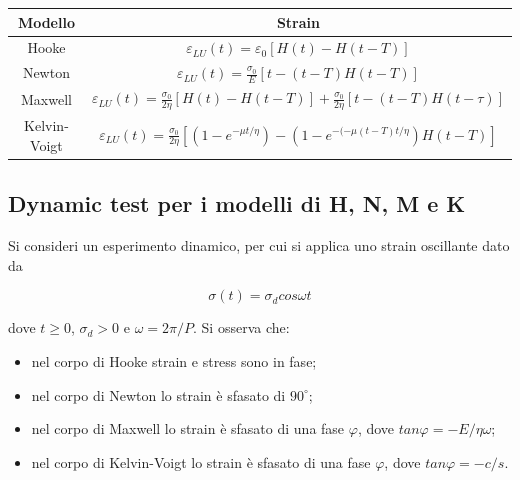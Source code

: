 \documentclass[a4paper,12pt]{book}
\begin{document}
\begin{table}[htb]
\renewcommand{\arraystretch}{1.3}
\setlength{\tabcolsep}{8pt}
\centering
\begin{tabular}{|c|c|}
    \hline
    \textbf{Modello} & \textbf{Strain} \\
    \hline
    \rowcolor{colore7!40}
    Hooke & $\varepsilon_{LU} (t) = \varepsilon_0 [H(t) - H(t-T)]$ \\
    \hline
    \rowcolor{colore2!40}
    Newton & $\varepsilon_{LU} (t) = \frac{\sigma_0}{E} [t - (t-T)H(t-T)]$ \\
    \hline
    \rowcolor{colore4!40}
    Maxwell & $\varepsilon_{LU} (t) = \frac{\sigma_0}{2\eta} [H(t) - H(t-T)] + \frac{\sigma_0}{2\eta} [t - (t-T) H(t-\tau)]$ \\
    \hline
    \rowcolor{colore5!40}
    Kelvin-Voigt & $\varepsilon_{LU} (t) = \frac{\sigma_0}{2\eta} \left[\left(1 - e^{-\mu t/\eta} \right) - \left( 1 - e^{-(- \mu(t-T)t/\eta} \right) H(t-T) \right] $ \\
    \hline
\end{tabular}
\end{table}

\subsection{\textcolor{colore7}{Dynamic test per i modelli di H, N, M e K}}

Si consideri un esperimento dinamico, per cui si applica uno strain oscillante dato da

\begin{equation}
    \sigma(t) = \sigma_d cos \omega t
\end{equation}

\noindent
dove $t \ge 0$, $\sigma_d > 0$ e $\omega = 2\pi/P$. Si osserva che:

\begin{itemize}
    \item nel corpo di Hooke strain e stress sono in fase;
    \item nel corpo di Newton lo strain è sfasato di $90^\circ$;
    \item nel corpo di Maxwell lo strain è sfasato di una fase $\varphi$, dove $tan \varphi = -E/\eta \omega$;
    \item nel corpo di Kelvin-Voigt lo strain è sfasato di una fase $\varphi$, dove $tan \varphi = -c/s$.
\end{itemize}
\end{document}
